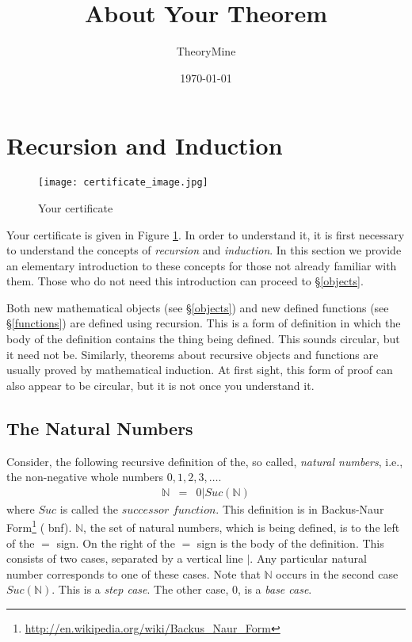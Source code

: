 \documentclass[twocolumn]{article}
\title{About Your Theorem}
\author{TheoryMine}
\date{\today}
\newcommand{\nat}{\mathbb{N}}
\begin{document}
\maketitle

\section{Recursion and Induction}
\label{recursion}



\begin{figure}[hbt]
\begin{center}
\texttt{[image: certificate\_image.jpg]}
\end{center}
\caption{Your certificate}
\label{certificate}
\end{figure}

Your certificate is given in Figure \ref{certificate}.  In order to understand
it, it is first necessary to understand the concepts of {\em recursion} and {\em
  induction}.  In this section we provide an elementary introduction to these
concepts for those not already familiar with them.  Those who do not need this
introduction can proceed to \S\ref{objects}.

Both new mathematical objects (see \S\ref{objects}) and new defined functions
(see \S\ref{functions}) are defined using recursion. This is a form of
definition in which the body of the definition contains the thing being
defined. This sounds circular, but it need not be. Similarly, theorems about
recursive objects and functions are usually proved by mathematical induction. At
first sight, this form of proof can also appear to be circular, but it is not
once you understand it.

\subsection{The Natural Numbers}
\label{naturals}

Consider, the following recursive definition of the, so called, {\em natural
  numbers}, i.e., the non-negative whole numbers $0, 1, 2, 3, \ldots$.
\begin{eqnarray}
 \nat & = & 0 |
Suc(\nat) \label{nats}
\end{eqnarray}
where $Suc$ is called the $successor$ $function$. This definition is in Backus-Naur
Form\footnote{\url{http://en.wikipedia.org/wiki/Backus_Naur_Form}} ({\sc
  bnf}). $\nat$, the set of natural numbers, which is being defined, is to the left
of the $=$ sign. On the right of the $=$ sign is the body of the
definition. This consists of two cases, separated by a vertical line $|$. Any
particular natural number corresponds to one of these cases.  Note that $\nat$
occurs in the second case $Suc(\nat)$. This is a {\em step case}. The other case,
$0$, is a {\em base case}.
\end{document}
